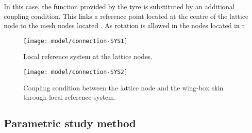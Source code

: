 In this case, the function provided by the tyre is substituted by an additional coupling condition. This links a reference point located at the centre of the lattice node to the mesh nodes located . As rotation is allowed in the nodes located in t 

\begin{figure}[!htpb]
  \centering
  \texttt{[image: model/connection-SYS1]}
  \caption[Local reference system at the lattice nodes]{Local reference system at the lattice nodes. }\label{fig:connection-sys1}
\end{figure}

\begin{figure}[!htpb]
  \centering
  \texttt{[image: model/connection-SYS2]}
  \caption[Coupling condition between the lattice node and the wing-box skin through local reference system]{Coupling condition between the lattice node and the wing-box skin through local reference system. }\label{fig:connection-sys2}
\end{figure}

\clearpage
\subsection{Parametric study method} \label{subsec:parametricStudy_computationalModel} 